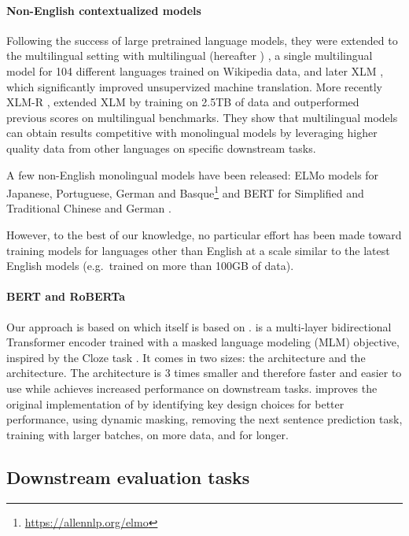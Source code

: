 \paragraph{Non-English contextualized models}
\label{contextualmodelsforotherlanguages}
Following the success of large pretrained language models, they were extended to the multilingual setting with multilingual \bert (hereafter \mbert) \cite{devlin-etal-2019-bert}, a single multilingual model for 104 different languages trained on Wikipedia data, and later XLM \cite{conneau-lample-2019-cross}, which significantly improved unsupervized machine translation.
More recently XLM-R \cite{conneau-etal-2020-unsupervised}, extended XLM by training on 2.5TB of data and outperformed previous scores on multilingual benchmarks. They show that multilingual models can obtain results competitive with monolingual models by leveraging higher quality data from other languages on specific downstream tasks.

A few non-English monolingual models have been released: ELMo models for Japanese, Portuguese, German and Basque\footnote{\url{https://allennlp.org/elmo}} and BERT for Simplified and Traditional Chinese \cite{devlin-etal-2019-bert} and German \cite{chan-etal-2019-german}.

However, to the best of our knowledge, no particular effort has been made toward training models for languages other than English at a scale similar to the latest English models (e.g.~\roberta trained on more than 100GB of data).

\paragraph{BERT and RoBERTa}
Our approach is based on \roberta \cite{liu-etal-2019-roberta} which itself is based on \bert \cite{devlin-etal-2019-bert}.
\bert is a multi-layer bidirectional Transformer encoder trained with a masked language modeling (MLM) objective, inspired by the Cloze task \cite{taylor-1953-cloze}.
It comes in two sizes: the \bertbase architecture and the \bertlarge architecture. The \bertbase architecture is 3 times smaller and therefore faster and easier to use while \bertlarge achieves increased performance on downstream tasks.
\roberta improves the original implementation of \bert by identifying key design choices for better performance, using dynamic masking, removing the next sentence prediction task, training with larger batches, on more data, and for longer.


\subsection{Downstream evaluation tasks}

